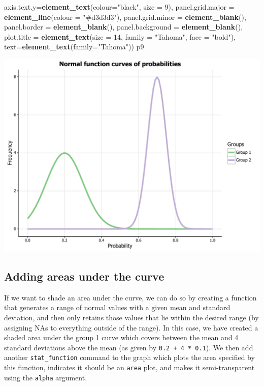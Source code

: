 \documentclass[]{article}
\newenvironment{Shaded}{\begin{snugshade}}{\end{snugshade}}
\newcommand{\KeywordTok}[1]{\textcolor[rgb]{0.13,0.29,0.53}{\textbf{{#1}}}}
\newcommand{\DataTypeTok}[1]{\textcolor[rgb]{0.13,0.29,0.53}{{#1}}}
\newcommand{\DecValTok}[1]{\textcolor[rgb]{0.00,0.00,0.81}{{#1}}}
\newcommand{\StringTok}[1]{\textcolor[rgb]{0.31,0.60,0.02}{{#1}}}
\newcommand{\NormalTok}[1]{{#1}}
\begin{document}
\begin{Shaded}
\begin{Highlighting}[]
            \DataTypeTok{axis.text.y=}\KeywordTok{element_text}\NormalTok{(}\DataTypeTok{colour=}\StringTok{"black"}\NormalTok{, }\DataTypeTok{size =} \DecValTok{9}\NormalTok{), }
            \DataTypeTok{panel.grid.major =} \KeywordTok{element_line}\NormalTok{(}\DataTypeTok{colour =} \StringTok{"#d3d3d3"}\NormalTok{), }
            \DataTypeTok{panel.grid.minor =} \KeywordTok{element_blank}\NormalTok{(), }
            \DataTypeTok{panel.border =} \KeywordTok{element_blank}\NormalTok{(), }\DataTypeTok{panel.background =} \KeywordTok{element_blank}\NormalTok{(),}
            \DataTypeTok{plot.title =} \KeywordTok{element_text}\NormalTok{(}\DataTypeTok{size =} \DecValTok{14}\NormalTok{, }\DataTypeTok{family =} \StringTok{"Tahoma"}\NormalTok{, }\DataTypeTok{face =} \StringTok{"bold"}\NormalTok{),}
            \DataTypeTok{text=}\KeywordTok{element_text}\NormalTok{(}\DataTypeTok{family=}\StringTok{"Tahoma"}\NormalTok{))}
\NormalTok{p9}
\end{Highlighting}
\end{Shaded}

\begin{center}\includegraphics{0_all_posts_pdf/function_16-1} \end{center}

\subsection{Adding areas under the
curve}\label{adding-areas-under-the-curve}

If we want to shade an area under the curve, we can do so by creating a
function that generates a range of normal values with a given mean and
standard deviation, and then only retains those values that lie within
the desired range (by assigning NAs to everything outside of the range).
In this case, we have created a shaded area under the group 1 curve
which covers between the mean and 4 standard deviations above the mean
(as given by \texttt{0.2\ +\ 4\ *\ 0.1}). We then add another
\texttt{stat\_function} command to the graph which plots the area
specified by this function, indicates it should be an \texttt{area}
plot, and makes it semi-transparent using the \texttt{alpha} argument.
\end{document}
